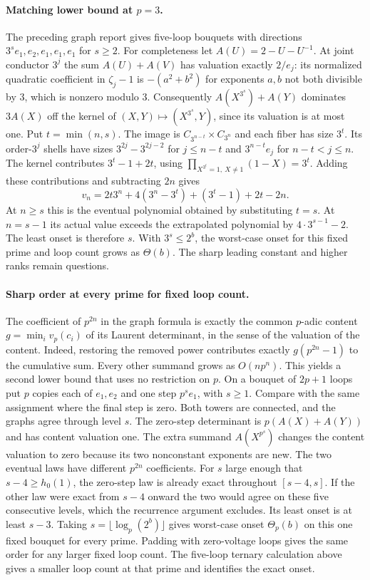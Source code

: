 \paragraph{Matching lower bound at $p=3$.}
The preceding graph report gives five-loop bouquets with directions
$3^s e_1,e_2,e_1,e_1,e_1$ for $s\ge2$.
For completeness let $A(U)=2-U-U^{-1}$. At joint conductor $3^j$
the sum $A(U)+A(V)$ has valuation exactly $2/e_j$: its normalized
quadratic coefficient in $\zeta_j-1$ is $-(a^2+b^2)$ for exponents
$a,b$ not both divisible by $3$, which is nonzero modulo $3$.
Consequently $A(X^{3^s})+A(Y)$ dominates $3A(X)$ off the
kernel of $(X,Y)\mapsto(X^{3^s},Y)$, since its valuation is at most
one. Put $t=\min(n,s)$. The image is $C_{3^{n-t}}\times C_{3^n}$
and each fiber has size $3^t$. Its order-$3^j$ shells have sizes
$3^{2j}-3^{2j-2}$ for $j\le n-t$ and $3^{n-t}e_j$ for $n-t<j\le n$.
The kernel contributes $3^t-1+2t$, using
$\prod_{X^{3^t}=1,\ X\ne1}(1-X)=3^t$.
Adding these contributions and subtracting $2n$ gives
\[
 v_n=2t3^n+4(3^n-3^t)+(3^t-1)+2t-2n.
\]
At $n\ge s$ this is the eventual polynomial obtained by substituting
$t=s$. At $n=s-1$ its actual value exceeds the extrapolated polynomial
by $4\cdot3^{s-1}-2$. The least onset is therefore $s$. With
$3^s\le2^b$, the worst-case onset for this fixed prime and loop count
grows as $\Theta(b)$. The sharp leading constant and higher ranks
remain questions.

\paragraph{Sharp order at every prime for fixed loop count.}
The coefficient of $p^{2n}$ in the graph formula is exactly the
common $p$-adic content $g=\min_i v_p(c_i)$ of its Laurent
determinant, in the sense of the valuation of the content. Indeed,
restoring the removed power contributes exactly $g(p^{2n}-1)$
to the cumulative sum. Every other summand grows as $O(np^n)$.
This yields a second lower bound that uses no restriction on $p$.
On a bouquet of $2p+1$ loops put $p$ copies each of $e_1,e_2$ and
one step $p^s e_1$, with $s\ge1$. Compare with the same assignment
where the final step is zero. Both towers are connected, and the
graphs agree through level $s$. The zero-step determinant is
$p(A(X)+A(Y))$ and has content valuation one. The extra summand
$A(X^{p^s})$ changes the content valuation to zero because its
two nonconstant exponents are new. The two eventual laws have
different $p^{2n}$ coefficients. For $s$ large enough that
$s-4\ge h_0(1)$, the zero-step law is already exact throughout
$[s-4,s]$. If the other law were exact from $s-4$ onward the
two would agree on these five consecutive levels, which the
recurrence argument excludes. Its least onset is at least $s-3$.
Taking $s=\lfloor\log_p(2^b)\rfloor$ gives worst-case onset
$\Theta_p(b)$ on this one fixed bouquet for every prime. Padding
with zero-voltage loops gives the same order for any larger fixed
loop count. The five-loop ternary calculation above gives a
smaller loop count at that prime and identifies the exact onset.

